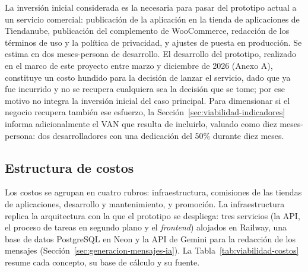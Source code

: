 La inversión inicial considerada es la necesaria para pasar del prototipo actual a un servicio comercial: publicación de la aplicación en la tienda de aplicaciones de Tiendanube, publicación del complemento de WooCommerce, redacción de los términos de uso y la política de privacidad, y ajustes de puesta en producción. Se estima en dos meses-persona de desarrollo. El desarrollo del prototipo, realizado en el marco de este proyecto entre marzo y diciembre de 2026 (Anexo A), constituye un costo hundido para la decisión de lanzar el servicio, dado que ya fue incurrido y no se recupera cualquiera sea la decisión que se tome; por ese motivo no integra la inversión inicial del caso principal. Para dimensionar si el negocio recupera también ese esfuerzo, la Sección~\ref{sec:viabilidad-indicadores} informa adicionalmente el VAN que resulta de incluirlo, valuado como diez meses-persona: dos desarrolladores con una dedicación del 50\% durante diez meses.

\subsection{Estructura de costos}
\label{sec:viabilidad-costos}

Los costos se agrupan en cuatro rubros: infraestructura, comisiones de las tiendas de aplicaciones, desarrollo y mantenimiento, y promoción. La infraestructura replica la arquitectura con la que el prototipo se despliega: tres servicios (la API, el proceso de tareas en segundo plano y el \emph{frontend}) alojados en Railway, una base de datos PostgreSQL en Neon y la API de Gemini para la redacción de los mensajes (Sección~\ref{sec:generacion-mensajes-ia}). La Tabla~\ref{tab:viabilidad-costos} resume cada concepto, su base de cálculo y su fuente.

